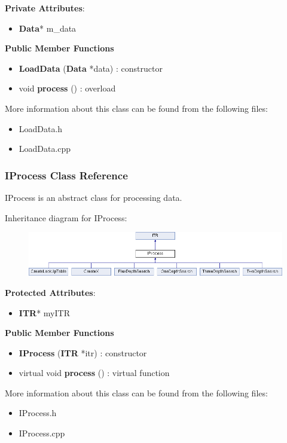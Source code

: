 \documentclass{article}
\begin{document}
\textbf{Private Attributes}:
\begin{itemize}
\item \textbf{Data}* m\_data
\end{itemize}

\textbf{Public Member Functions}
\begin{itemize}
\item \textbf{LoadData } (\textbf{Data} *data) : constructor
\item void \textbf{process} () : overload
\end{itemize}

More information about this class can be found from the following files:
\begin{itemize}
\item LoadData.h
\item LoadData.cpp
\end{itemize}


\subsubsection{IProcess Class Reference}
IProcess is an abstract class for processing data.

Inheritance diagram for IProcess:
\begin{figure}[H]
\centering
\includegraphics[width=1\textwidth]{class_i_process.png}
\end{figure}

\textbf{Protected Attributes}:
\begin{itemize}
\item \textbf{ITR}* myITR
\end{itemize}

\textbf{Public Member Functions}
\begin{itemize}
\item \textbf{IProcess} (\textbf{ITR} *itr) : constructor
\item virtual void \textbf{process} () : virtual function
\end{itemize}

More information about this class can be found from the following files:
\begin{itemize}
\item IProcess.h
\item IProcess.cpp
\end{itemize}
\end{document}
